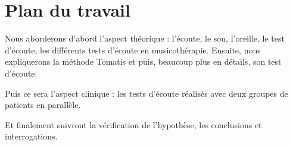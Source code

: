 \section{Plan du travail}

Nous aborderons d'abord l'aspect théorique : l'écoute, le son, l'oreille, le 
test d'écoute, les différents tests d'écoute en musicothérapie.  Ensuite, nous 
expliquerons  la méthode Tomatis
et puis, beaucoup plus en détails,  son test d'écoute.

Puis ce sera l'aspect clinique : les tests d'écoute réalisés  avec deux groupes 
de patients en parallèle.

Et finalement suivront la vérification de l'hypothèse, les conclusions et 
interrogations. 
